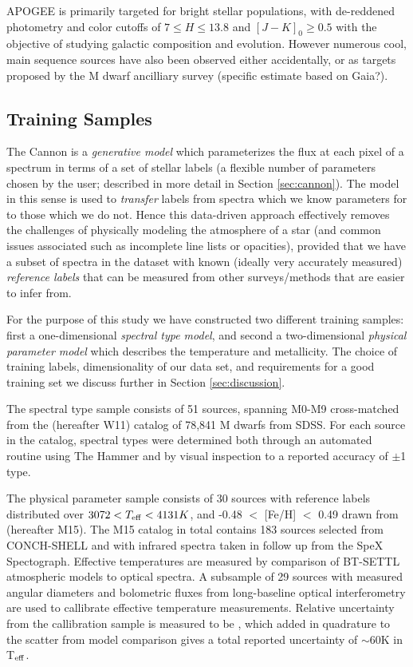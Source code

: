 \documentclass[modern]{aastex62}
\begin{document}
APOGEE is primarily targeted for bright stellar populations, with de-reddened photometry and color cutoffs of $7 \leq H \leq 13.8$ and $[J-K]_0 \geq 0.5$ \citep{Zasowski:2013} with the objective of studying galactic composition and evolution. However numerous cool, main sequence sources have also been observed either accidentally, or as targets proposed by the M dwarf ancilliary survey \citep{Desphande:2013} (specific estimate based on Gaia?).


\subsection{Training Samples}

The Cannon is a \emph{generative model} which parameterizes the flux at each pixel of a spectrum in terms of a set of stellar labels (a flexible number of parameters chosen by the user; described in more detail in Section \ref{sec:cannon}). The model in this sense is used to \emph{transfer} labels from spectra which we know parameters for to those which we do not. Hence this data-driven approach effectively removes the challenges of physically modeling the atmosphere of a star (and common issues associated such as incomplete line lists or opacities), provided that we have a subset of spectra in the dataset with known (ideally very accurately measured) \emph{reference labels} that can be measured from other surveys/methods that are easier to infer from. 

For the purpose of this study we have constructed two different training samples: first a one-dimensional \emph{spectral type model}, and second a two-dimensional \emph{physical parameter model} which describes the temperature and metallicity. The choice of training labels, dimensionality of our data set, and requirements for a good training set we discuss further in Section \ref{sec:discussion}.

The spectral type sample consists of 51 sources, spanning M0-M9 cross-matched from the \citealt{West:2011} (hereafter W11) catalog of 78,841 M dwarfs from SDSS. For each source in the catalog, spectral types were determined both through an automated routine using The Hammer \citep{Covey:2007} and by visual inspection to a reported accuracy of $\pm$1 type.

The physical parameter sample consists of 30 sources with reference labels distributed over $3072 < T_{\rm eff} < 4131K$, and -0.48 $<$ [Fe/H] $<$ 0.49 drawn from \citealt{Mann:2015} (hereafter M15). The M15 catalog in total contains 183 sources selected from CONCH-SHELL \citep{Gaidos:2013} and with infrared spectra taken in follow up from the SpeX Spectograph. Effective temperatures are measured by comparison of BT-SETTL atmospheric models \citep{Allard:2011} to optical spectra. A subsample of 29 sources with measured angular diameters and bolometric fluxes from long-baseline optical interferometry are used to callibrate effective temperature measurements. Relative uncertainty from the callibration sample is measured to be \color{red}{$\sim$30K (check this)}\color{black}, which added in quadrature to the scatter from model comparison gives a total reported uncertainty of $\sim$60K in T$_{\rm eff}$. 
\end{document}
